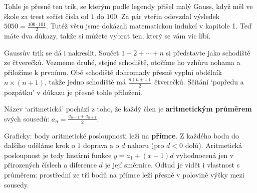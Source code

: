Tohle je přesně ten trik, se kterým podle legendy přišel malý Gauss, když měl ve škole za trest sečíst čísla od $1$ do $100$. Za pár vteřin odevzdal výsledek $5050 = \frac{100\cdot 101}{2}$. Tutéž větu jsme dokázali matematickou indukcí v kapitole 1. Teď máte dva důkazy, takže si můžete vybrat ten, který se vám víc líbí.

Gaussův trik se dá i nakreslit. Součet $1 + 2 + \cdots + n$ si představte jako schodiště ze čtverečků. Vezmeme druhé, stejné schodiště, otočíme ho vzhůru nohama a přiložíme k prvnímu. Obě schodiště dohromady přesně vyplní obdélník $n\times(n + 1)$, takže jedno schodiště má $\frac{n(n + 1)}{2}$ čtverečků. Sčítání `popředu a pozpátku' v důkazu je přesně tohle přiložení.

\begin{center}
\end{center}

Název `aritmetická' pochází z toho, že každý člen je \textbf{aritmetickým průměrem} svých sousedů: $a_n = \frac{a_{n-1} + a_{n+1}}{2}$.

Graficky: body aritmetické posloupnosti leží na \textbf{přímce}. Z každého bodu do dalšího uděláme krok o $1$ doprava a o $d$ nahoru (pro $d < 0$ dolů). Aritmetická posloupnost je tedy lineární funkce $y = a_1 + (x - 1)d$ vyhodnocená jen v přirozených číslech a diference $d$ je její směrnice. Odtud je vidět i vlastnost s průměrem: prostřední ze tří bodů na přímce leží přesně v polovině výšky mezi sousedy.

